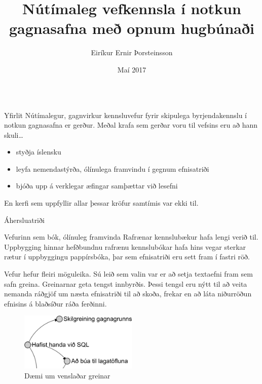\documentclass[final]{beamer}
\title{Nútímaleg vefkennsla í notkun gagnasafna með opnum hugbúnaði}
\author{Eiríkur Ernir Þorsteinsson}
\institute{Iðnaðarverkfræði-, vélaverkfræði- og tölvunarfræðideild}
\date{Maí 2017}
\begin{document}
\begin{frame}
\begin{tcolorbox}[standard jigsaw, height=97cm, colframe=orange, opacityback=0, sharp corners=all]
\begin{columns}[t]

\begin{column}{.47\linewidth}

\begin{block}{Yfirlit}
    Nútímalegur, gagnvirkur kennsluvefur fyrir skipulega byrjendakennslu í notkun gagnasafna er gerður. Meðal krafa sem gerðar voru til vefsins eru að hann skuli\ldots
    \begin{itemize}
        \item styðja íslensku
        \item leyfa nemendastýrða, ólínulega framvindu í gegnum efnisatriði
        \item bjóða upp á verklegar æfingar samþættar við lesefni
    \end{itemize}
    En kerfi sem uppfyllir allar þessar kröfur samtímis var ekki til.
\end{block}

\begin{block}{Áhersluatriði}

    \begin{subblock}{Vefurinn sem bók, ólínuleg framvinda} 
        Rafrænar kennslubækur hafa lengi verið til. Uppbygging hinnar hefðbundnu rafrænu kennslubókar hafa hins vegar sterkar rætur í uppbyggingu pappírsbóka, þar sem efnisatriði eru sett fram í fastri röð.

        Vefur hefur fleiri möguleika. Sú leið sem valin var er að setja textaefni fram sem safn greina. 
        Greinarnar geta tengst innbyrðis. Þessi tengsl eru nýtt til að veita nemanda ráðgjöf um næsta efnisatriði til að skoða, frekar en að láta niðurröðun efnisins á blaðsíður ráða ferðinni.
        \begin{figure}
            \caption{Dæmi um venslaðar greinar}
            \includegraphics[width=0.5\textwidth]{relational-sections}
        \end{figure}
    \end{subblock}


\end{block}
\end{column}
\end{columns}
\end{tcolorbox}
\end{frame}
\end{document}
